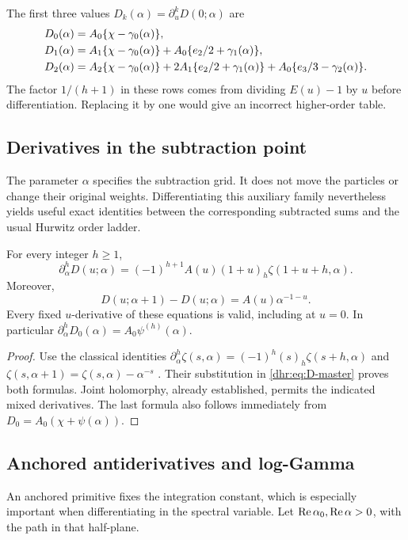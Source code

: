 The first three values $D_k(\alpha)=\partial_u^kD(0;\alpha)$ are
\begin{align}
 D_0(\alpha)&=A_0\{\chi-\gamma_0(\alpha)\},\notag\\
 D_1(\alpha)&=A_1\{\chi-\gamma_0(\alpha)\}
                   +A_0\{e_2/2+\gamma_1(\alpha)\},\notag\\
 D_2(\alpha)&=A_2\{\chi-\gamma_0(\alpha)\}
          +2A_1\{e_2/2+\gamma_1(\alpha)\}
          +A_0\{e_3/3-\gamma_2(\alpha)\}.
 \label{dhr:eq:first-jets}
\end{align}
The factor $1/(h+1)$ in these rows comes from dividing $E(u)-1$ by
$u$ before differentiation. Replacing it by one would give an
incorrect higher-order table.

\subsection{Derivatives in the subtraction point}
The parameter $\alpha$ specifies the subtraction grid. It does not
move the particles or change their original weights. Differentiating
this auxiliary family nevertheless yields useful exact identities
between the corresponding subtracted sums and the usual Hurwitz
order ladder.

\begin{proposition}\label{dhr:prop:alpha}
For every integer $h\geq1$,
\begin{equation}\label{dhr:eq:alpha-derivative}
 \partial_\alpha^hD(u;\alpha)
 =(-1)^{h+1}A(u)(1+u)_h\zeta(1+u+h,\alpha).
\end{equation}
Moreover,
\begin{equation}\label{dhr:eq:alpha-shift}
 D(u;\alpha+1)-D(u;\alpha)=A(u)\alpha^{-1-u}.
\end{equation}
Every fixed $u$-derivative of these equations is valid, including
at $u=0$. In particular
$\partial_\alpha^hD_0(\alpha)=A_0\psi^{(h)}(\alpha)$.
\end{proposition}
\begin{proof}
Use the classical identities
$\partial_\alpha^h\zeta(s,\alpha)=(-1)^h(s)_h\zeta(s+h,\alpha)$
and $\zeta(s,\alpha+1)=\zeta(s,\alpha)-\alpha^{-s}$
\cite{dlmf:hurwitz}. Their substitution in
\eqref{dhr:eq:D-master} proves both formulas. Joint holomorphy, already
established, permits the indicated mixed derivatives. The last formula
also follows immediately from $D_0=A_0(\chi+\psi(\alpha))$.
\end{proof}

\subsection{Anchored antiderivatives and log-Gamma}
An anchored primitive fixes the integration constant, which is especially
important when differentiating in the spectral variable. Let
$\operatorname{Re}\alpha_0,\operatorname{Re}\alpha>0$, with the path in that half-plane.

